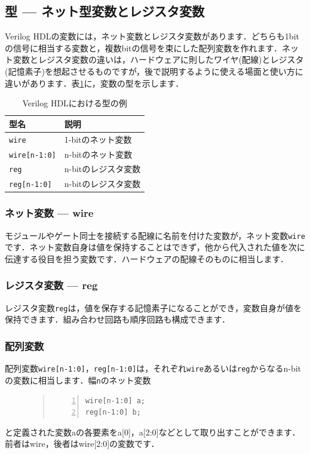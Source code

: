 \documentclass[a4paper,dvipdfmx]{jsarticle}
\begin{document}
\subsection{型 --- ネット型変数とレジスタ変数}
Verilog HDLの変数には，ネット変数とレジスタ変数があります．どちらも1bitの信号に相当する変数と，複数bitの信号を束にした配列変数を作れます．ネット変数とレジスタ変数の違いは，ハードウェアに則したワイヤ(配線)とレジスタ(記憶素子)を想起させるものですが，後で説明するように使える場面と使い方に違いがあります．表\ref{tbl:verilog_types}に，変数の型を示します．

\begin{table}[H]
\begin{center}
 \begin{tabular}{l|l}
 \hline
  型名               & 説明 \\\hline\hline
  \verb|wire|        & 1-bitのネット変数 \\\hline
  \verb|wire[n-1:0]| & n-bitのネット変数 \\\hline
  \verb|reg|         & n-bitのレジスタ変数 \\\hline
  \verb|reg[n-1:0]|  & n-bitのレジスタ変数 \\\hline
 \end{tabular}
\end{center}
\caption{Verilog HDLにおける型の例\label{tbl:verilog_types}}
\end{table}

\subsubsection{ネット変数 --- wire}
モジュールやゲート同士を接続する配線に名前を付けた変数が，ネット変数\verb|wire|です．ネット変数自身は値を保持することはできず，他から代入された値を次に伝達する役目を担う変数です．ハードウェアの配線そのものに相当します．

\subsubsection{レジスタ変数 --- reg}
レジスタ変数\verb|reg|は，値を保存する記憶素子になることができ，変数自身が値を保持できます．組み合わせ回路も順序回路も構成できます．

\subsubsection{配列変数}
配列変数\verb|wire[n-1:0]|，\verb|reg[n-1:0]|は，それぞれ\verb|wire|あるいは\verb|reg|からなるn-bitの変数に相当します．幅\verb|n|のネット変数
\begin{figure}[H]
\begin{quote}
\begin{Verbatim}[frame=single, numbers=left, baselinestretch=0.8]
wire[n-1:0] a;
reg[n-1:0] b;
\end{Verbatim}
\end{quote}
\end{figure}
と定義された変数aの各要素をa[0]，a[2:0]などとして取り出すことができます．前者はwire，後者はwire[2:0]の変数です．
\end{document}
